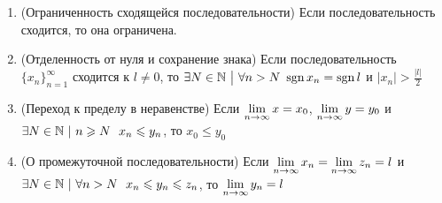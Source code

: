 \begin{theorem}
	\begin{enumerate}
		\item (Ограниченность сходящейся последовательности) Если последовательность сходится, то она ограничена.
		
		\item (Отделенность от нуля и сохранение знака) Если последовательность $\{x_n\}_{n = 1}^\infty$ сходится к $l \neq 0$, то $\exists N \in \N \such \forall n > N\ \sgn x_n = \sgn l$ и $|x_n| > \frac{|l|}{2}$
		
		\item (Переход к пределу в неравенстве) Если $\lim\limits_{n \to \infty} x = x_0$, $\lim\limits_{n \to \infty} y = y_0$ и $\exists N \in \mathbb{N}\ |\ n \geqslant N\ \ x_n \leqslant y_n$, то $x_0 \le y_0$
		
		\item (О промежуточной последовательности) Если $\lim\limits_{n \to \infty} x_n = \lim\limits_{n \to \infty} z_n = l$ и $\exists N \in \mathbb{N}\ |\ \forall n > N\ \ x_n \leqslant y_n \leqslant z_n$, то $\lim\limits_{n \to \infty} y_n = l$
	\end{enumerate}
\end{theorem}

